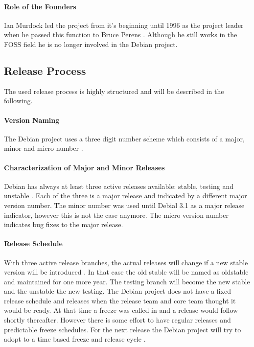\paragraph{Role of the Founders}

Ian Murdock led the project from it's beginning until 1996 as the project
leader when he passed this function to Bruce Perens
\cite{DebianFAQ,DebianHistory}. Although he still works in the \ac{FOSS} field
he is no longer involved in the Debian project.

\subsection{Release Process}

The used release process is highly structured and will be described in the
following.

\paragraph{Version Naming}

The Debian project uses a three digit number scheme which consists of a major,
minor and micro number \cite{DebianReleases}.

\paragraph{Characterization of Major and Minor Releases}

Debian has always at least three active releases available: stable, testing and
unstable \cite{DebianReleases,DebianReleaseManagement}. Each of the three is a
major release and indicated by a different major version number. The minor
number was used until Debial 3.1 as a major release indicator, however this is
not the case anymore. The micro version number indicates bug fixes to the major
release.

\paragraph{Release Schedule}

With three active release branches, the actual releases will change if a new
stable version will be introduced
\cite{McGovern2011,DebianReleaseManagement,DebianReleaseGoals}. In that case
the old stable will be named as oldstable and maintained for one more year. The
testing branch will become the new stable and the unstable the new testing. The
Debian project does not have a fixed release schedule and releases when the
release team and core team thought it would be ready. At that time a freeze was
called in and a release would follow shortly thereafter. However there is some
effort to have regular releases and predictable freeze schedules. For the next
release the Debian project will try to adopt to a time based freeze and release
cycle \cite{McGovern2011}.

